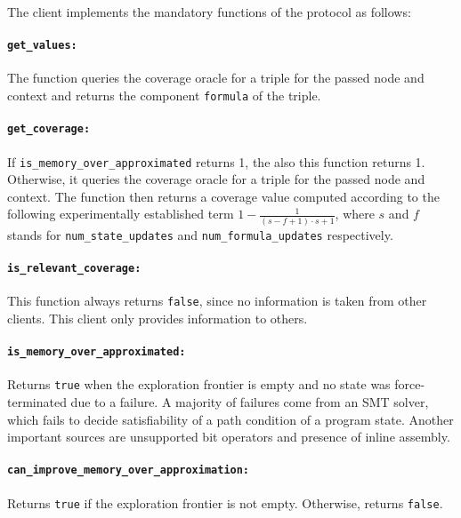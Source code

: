 \documentclass[envcountsame]{llncs}
\begin{document}
The client implements the mandatory functions of the protocol as follows:

\paragraph{\tt get\_values: }

The function queries the coverage oracle for a triple for the passed node and
context and returns the component \texttt{formula} of the triple.

\paragraph{\tt get\_coverage: }

If \texttt{is\_memory\_over\_approximated} returns 1, the also this function
returns 1. Otherwise, it queries the coverage oracle for a triple for the passed
node and context. The function then returns a coverage value computed according
to the following experimentally established term $ 1 - \frac{1}{(s - f + 1)
\cdot s + 1} $, where $ s $ and $ f $ stands for \texttt{num\_state\_updates}
and \texttt{num\_formula\_updates} respectively.


\paragraph{\tt is\_relevant\_coverage: }

This function always returns \texttt{false}, since no information is taken from
other clients. This client only provides information to others.

\paragraph{\tt is\_memory\_over\_approximated: }

Returns \texttt{true} when the exploration frontier is empty and no state was
force-terminated due to a failure. A majority of failures come from an SMT
solver, which fails to decide satisfiability of a path condition of a program
state. Another important sources are unsupported bit operators and presence of
inline assembly.

\paragraph{\tt can\_improve\_memory\_over\_approximation: }

Returns \texttt{true} if the exploration frontier is not empty. Otherwise,
returns \texttt{false}.
\end{document}
